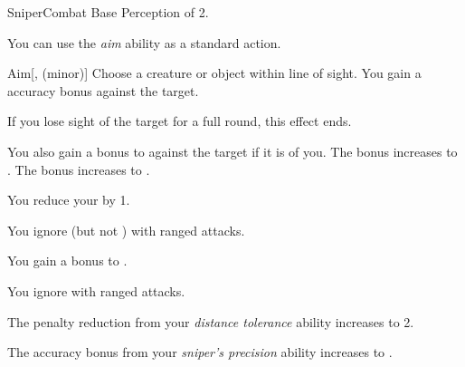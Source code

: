     \begin{feat}{Sniper}{Combat}
        \featpre Base Perception of 2.

         You can use the \textit{aim} ability as a standard action.
        \begin{freeability}{Aim}[,  (minor)]
            Choose a creature or object within line of sight.
            You gain a  accuracy bonus against the target.

            If you lose sight of the target for a full round, this effect ends.

            \rankline
             You also gain a  bonus to  against the target if it is \unaware of you.
             The  bonus increases to .
             The  bonus increases to .
        \end{freeability}

         You reduce your  by 1.

         You ignore  (but not ) with ranged attacks.

         You gain a  bonus to .

         You ignore  with ranged attacks.

         The penalty reduction from your \textit{distance tolerance} ability increases to 2.

         The accuracy bonus from your \textit{sniper's precision} ability increases to .
    \end{feat}

